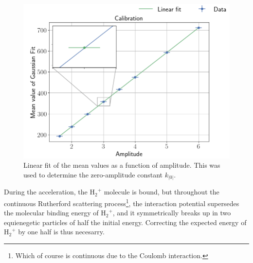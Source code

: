\begin{figure}[t]
\centering
\includegraphics[width=0.99\columnwidth]{k0_plotting}
\caption{Linear fit of the mean values as a function of amplitude. This was
used to determine the zero-amplitude constant $k_|0|$.}
\label{fig_linear_fit}
\end{figure}
During the acceleration, the $\mathrm{{H_2}^{+}}$ molecule is bound, but
throughout the continuous Rutherford scattering process\footnote{Which of course
is continuous due to the Coulomb interaction.}, the interaction potential
supersedes the molecular binding energy of $\mathrm{{H_2}^{+}}$, and it
symmetrically breaks up in two equienegetic particles of half the initial
energy. Correcting the expected energy of $\mathrm{{H_2}^{+}}$ by one half is
thus necesarry.

